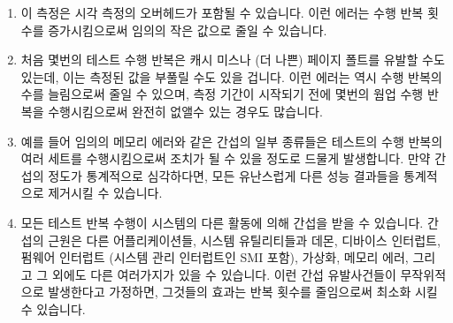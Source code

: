 \begin{enumerate}
\item	이 측정은 시각 측정의 오버헤드가 포함될 수 있습니다.
	이런 에러는 수행 반복 횟수를 증가시킴으로써 임의의 작은 값으로 줄일 수
	있습니다.
\item	처음 몇번의 테스트 수행 반복은 캐시 미스나 (더 나쁜) 페이지 폴트를
	유발할 수도 있는데, 이는 측정된 값을 부풀릴 수도 있을 겁니다.
	이런 에러는 역시 수행 반복의 수를 늘림으로써 줄일 수 있으며, 측정
	기간이 시작되기 전에 몇번의 웜업 수행 반복을 수행시킴으로써 완전히
	없앨수 있는 경우도 많습니다.
\item	예를 들어 임의의 메모리 에러와 같은 간섭의 일부 종류들은 테스트의 수행
	반복의 여러 세트를 수행시킴으로써 조치가 될 수 있을 정도로 드물게
	발생합니다.
	만약 간섭의 정도가 통계적으로 심각하다면, 모든 유난스럽게 다른 성능
	결과들을 통계적으로 제거시킬 수 있습니다.

\item	모든 테스트 반복 수행이 시스템의 다른 활동에 의해 간섭을 받을 수
	있습니다.
	간섭의 근원은 다른 어플리케이션들, 시스템 유틸리티들과 데몬, 디바이스
	인터럽트, 펌웨어 인터럽트 (시스템 관리 인터럽트인 SMI 포함), 가상화,
	메모리 에러, 그리고 그 외에도 다른 여러가지가 있을 수 있습니다.
	이런 간섭 유발사건들이 무작위적으로 발생한다고 가정하면, 그것들의
	효과는 반복 횟수를 줄임으로써 최소화 시킬 수 있습니다.

\end{enumerate}

